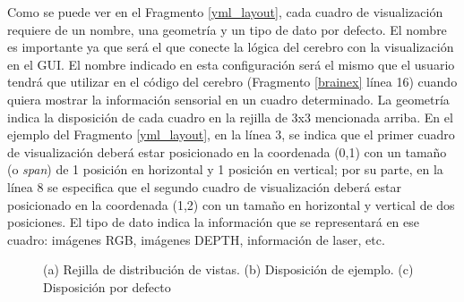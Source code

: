 Como se puede ver en el Fragmento \ref{yml_layout}, cada cuadro de visualización requiere de un nombre, una geometría y un tipo de dato por defecto. El nombre es importante ya que será el que conecte la lógica del cerebro con la visualización en el GUI. El nombre indicado en esta configuración será el mismo que el usuario tendrá que utilizar en el código del cerebro (Fragmento \ref{brainex} línea 16) cuando quiera mostrar la información sensorial en un cuadro determinado. La geometría indica la disposición de cada cuadro en la rejilla de 3x3 mencionada arriba. En el ejemplo del Fragmento \ref{yml_layout}, en la línea 3, se indica que el primer cuadro de visualización deberá estar posicionado en la coordenada (0,1) con un tamaño (o \textit{span}) de 1 posición en horizontal y 1 posición en vertical; por su parte, en la línea 8 se especifica que el segundo cuadro de visualización deberá estar posicionado en la coordenada (1,2) con un tamaño en horizontal y vertical de dos posiciones. El tipo de dato indica la información que se representará en ese cuadro: imágenes RGB, imágenes DEPTH, información de laser, etc.

\begin{figure}
	\begin{center}
		\hspace{0.1cm}
		\hspace{0.1cm}
	\end{center}	
	\centering
	\captionsetup{justification=centering,margin=0.1cm}
	\caption{(a) Rejilla de distribución de vistas. (b) Disposición de ejemplo. (c) Disposición por defecto }
	\label{fig:matrix_layout}
\end{figure}


